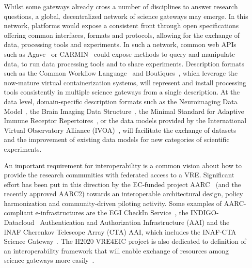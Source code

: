 \documentclass[review]{elsarticle}
\begin{document}
Whilst some gateways already cross a number of disciplines to answer research questions, a global, decentralized network of science gateways may emerge. In this network, platforms would expose a consistent front through open specifications offering common interfaces, formats and protocols, allowing for the exchange of data, processing tools and experiments. In such a network, common web APIs such as Agave~\cite{agave-8} or CARMIN~\cite{carmin-9} could expose methods to query and manipulate data, to run data processing tools and to share experiments. Description formats such as the Common Workflow Language~\cite{cwl-10} and Boutiques~\cite{boutiques-11}, which leverage the now-mature virtual containerization systems, will represent and install processing tools consistently in multiple science gateways from a single description. At the data level, domain-specific description formats such as the Neuroimaging Data Model~\cite{nidm-12}, the Brain Imaging Data Structure~\cite{bids-13}, the Minimal Standard for Adaptive Immune Receptor Repertoires~\cite{rubelt-82,Breden-83}, or the data models provided by the International Virtual Observatory Alliance (IVOA)~\cite{ivoa-14}, will facilitate the exchange of datasets and the improvement of existing data models for new categories of scientific experiments. 

An important requirement for  interoperability is a common vision about how to provide the research communities with federated access to a VRE. 
Significant effort has been put in this direction by the EC-funded project AARC~\cite{aarc-50} (and the recently approved  AARC2) towards an interoperable architectural design, policy harmonization and community-driven piloting activity. Some examples of AARC-compliant e-infrastructures are the EGI CheckIn Service~\cite{aai-51}, the  INDIGO-Datacloud~\cite{indigo-52} Authentication and Authorization Infrastructure (AAI)  and the INAF Cherenkov Telescope Array (CTA) AAI, which includes the INAF-CTA Science Gateway~\cite{Costa2015-53}. The H2020 VRE4EIC project is also dedicated to definition of an interoperability framework that will enable exchange of resources among science gateways more easily~\cite{vre4eic-21}.
\end{document}
